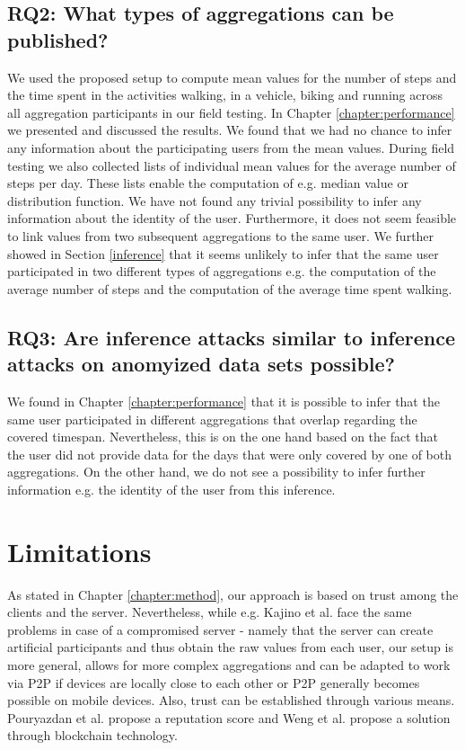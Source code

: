 \subsection*{RQ2: What types of aggregations can be published?}
We used the proposed setup to compute mean values for the number of steps and the time spent in the activities walking, in a vehicle, biking and running across all aggregation participants in our field testing. In Chapter \ref{chapter:performance} we presented and discussed the results. We found that we had no chance to infer any information about the participating users from the mean values. During field testing we also collected lists of individual mean values for the average number of steps per day. These lists enable the computation of e.g. median value or distribution function. We have not found any trivial possibility to infer any information about the identity of the user. Furthermore, it does not seem feasible to link values from two subsequent aggregations to the same user. We further showed in Section \ref{inference} that it seems unlikely to infer that the same user participated in two different types of aggregations e.g. the computation of the average number of steps and the computation of the average time spent walking.

\subsection*{RQ3: Are inference attacks similar to inference attacks on anomyized data sets possible?}
We found in Chapter \ref{chapter:performance} that it is possible to infer that the same user participated in different aggregations that overlap regarding the covered timespan. Nevertheless, this is on the one hand based on the fact that the user did not provide data for the days that were only covered by one of both aggregations. On the other hand, we do not see a possibility to infer further information e.g. the identity of the user from this inference.

\section{Limitations}
As stated in Chapter \ref{chapter:method}, our approach is based on trust among the clients and the server. Nevertheless, while e.g. Kajino et al. \parencite{crowdsourcing} face the same problems in case of a compromised server - namely that the server can create artificial participants and thus obtain the raw values from each user, our setup is more general, allows for more complex aggregations and can be adapted to work via P2P if devices are locally close to each other or P2P generally becomes possible on mobile devices. Also, trust can be established through various means. Pouryazdan et al. \parencite{pouryazdan2017quantifying} propose a reputation score and Weng et al. \parencite{li2018crowdbc} propose a solution through blockchain technology.

